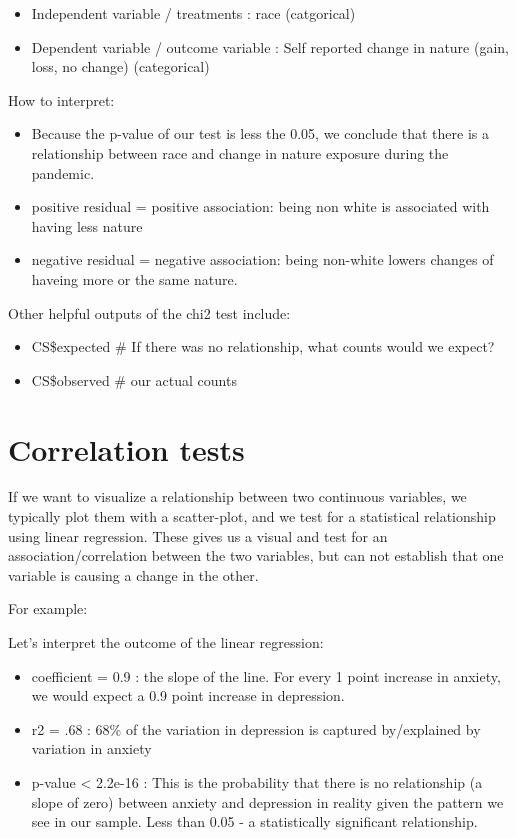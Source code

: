 \documentclass[
]{book}
\providecommand{\tightlist}{%
  \setlength{\itemsep}{0pt}\setlength{\parskip}{0pt}}
\begin{document}
\begin{itemize}
\tightlist
\item
  Independent variable / treatments : race (catgorical)
\item
  Dependent variable / outcome variable : Self reported change in nature (gain, loss, no change) (categorical)
\end{itemize}

How to interpret:

\begin{itemize}
\tightlist
\item
  Because the p-value of our test is less the 0.05, we conclude that there is a relationship between race and change in nature exposure during the pandemic.
\item
  positive residual = positive association: being non white is associated with having less nature
\item
  negative residual = negative association: being non-white lowers changes of haveing more or the same nature.
\end{itemize}

Other helpful outputs of the chi2 test include:

\begin{itemize}
\tightlist
\item
  CS\$expected \# If there was no relationship, what counts would we expect?
\item
  CS\$observed \# our actual counts
\end{itemize}

\hypertarget{correlation-tests}{%
\section{Correlation tests}\label{correlation-tests}}

If we want to visualize a relationship between two continuous variables, we typically plot them with a scatter-plot, and we test for a statistical relationship using linear regression. These gives us a visual and test for an association/correlation between the two variables, but can not establish that one variable is causing a change in the other.

For example:

Let's interpret the outcome of the linear regression:

\begin{itemize}
\tightlist
\item
  coefficient = 0.9 : the slope of the line. For every 1 point increase in anxiety, we would expect a 0.9 point increase in depression.
\item
  r2 = .68 : 68\% of the variation in depression is captured by/explained by variation in anxiety
\item
  p-value \textless{} 2.2e-16 : This is the probability that there is no relationship (a slope of zero) between anxiety and depression in reality given the pattern we see in our sample. Less than 0.05 - a statistically significant relationship.
\end{itemize}
\end{document}
